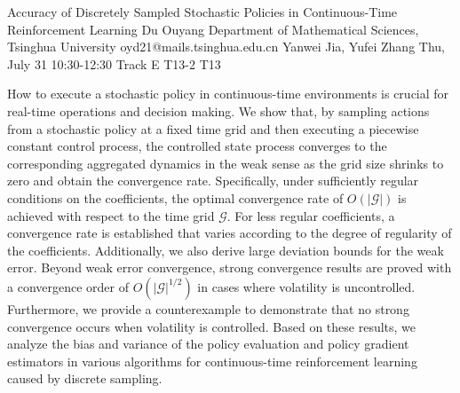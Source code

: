 \begin{talk}
  {Accuracy of Discretely Sampled Stochastic Policies in Continuous-Time Reinforcement Learning}%
  {Du Ouyang}%
  {Department of Mathematical Sciences, Tsinghua University}%
  {oyd21@mails.tsinghua.edu.cn}%
  {Yanwei Jia, Yufei Zhang}%
  {}%
  {Thu, July 31 10:30-12:30 Track E}%
  {T13-2}%
  {T13}%
  
				
			


\medskip

How to execute a stochastic policy in continuous-time environments is crucial for real-time operations and decision making. We show that, by sampling actions from a stochastic policy at a fixed time grid and then executing a piecewise constant control process, the controlled state process converges to the corresponding aggregated dynamics in the weak sense as the grid size shrinks to zero and obtain the convergence rate. Specifically, under sufficiently regular conditions on the coefficients, the optimal convergence rate of $O(|\mathscr{G}|)$ is achieved with respect to the time grid $\mathscr{G}$. For less regular coefficients, a convergence rate is established that varies according to the degree of regularity of the coefficients. Additionally, we also derive large deviation bounds for the weak error. Beyond weak error convergence, strong convergence results are proved with a convergence order of $O(|\mathscr{G}|^{1/2})$ in cases where volatility is uncontrolled. Furthermore, we provide a counterexample to demonstrate that no strong convergence occurs when volatility is controlled. Based on these results, we analyze the bias and variance of the policy evaluation and policy gradient estimators in various algorithms for continuous-time reinforcement learning caused by discrete sampling.


\end{talk}

